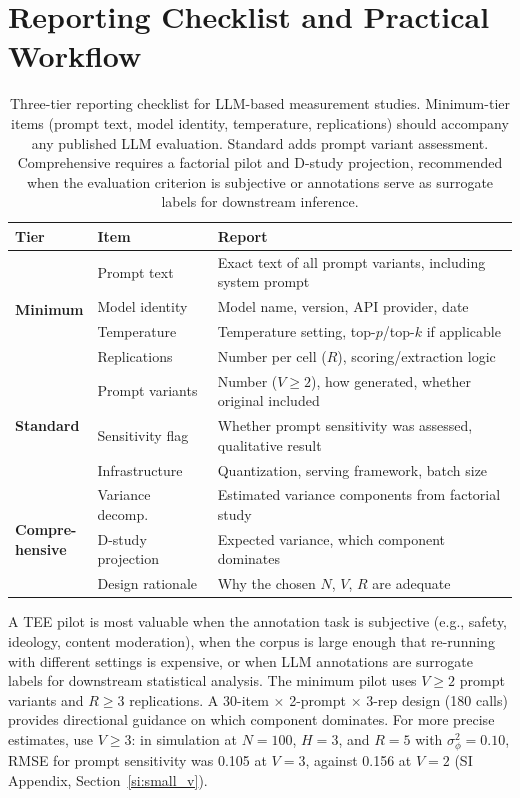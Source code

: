 \clearpage

\section{Reporting Checklist and Practical Workflow}
\label{si:checklist}

\begin{table}[ht]
\centering
\caption{Three-tier reporting checklist for LLM-based measurement studies. Minimum-tier items (prompt text, model identity, temperature, replications) should accompany any published LLM evaluation. Standard adds prompt variant assessment. Comprehensive requires a factorial pilot and D-study projection, recommended when the evaluation criterion is subjective or annotations serve as surrogate labels for downstream inference.}
\label{tab:checklist}
\small
\begin{tabular}{llp{7.5cm}}
\toprule
\textbf{Tier} & \textbf{Item} & \textbf{Report} \\
\midrule
\multirow{4}{*}{\textbf{Minimum}}
  & Prompt text & Exact text of all prompt variants, including system prompt \\
  & Model identity & Model name, version, API provider, date \\
  & Temperature & Temperature setting, top-$p$/top-$k$ if applicable \\
  & Replications & Number per cell ($R$), scoring/extraction logic \\
\midrule
\multirow{3}{*}{\textbf{Standard}}
  & Prompt variants & Number ($V \geq 2$), how generated, whether original included \\
  & Sensitivity flag & Whether prompt sensitivity was assessed, qualitative result \\
  & Infrastructure & Quantization, serving framework, batch size \\
\midrule
\multirow{3}{*}{\parbox{2.2cm}{\textbf{Compre-\\hensive}}}
  & Variance decomp. & Estimated variance components from factorial study \\
  & D-study projection & Expected variance, which component dominates \\
  & Design rationale & Why the chosen $N$, $V$, $R$ are adequate \\
\bottomrule
\end{tabular}
\end{table}

A TEE pilot is most valuable when the annotation task is subjective (e.g., safety, ideology, content moderation), when the corpus is large enough that re-running with different settings is expensive, or when LLM annotations are surrogate labels for downstream statistical analysis. The minimum pilot uses $V \geq 2$ prompt variants and $R \geq 3$ replications. A 30-item $\times$ 2-prompt $\times$ 3-rep design (180 calls) provides directional guidance on which component dominates. For more precise estimates, use $V \geq 3$: in simulation at $N = 100$, $H = 3$, and $R = 5$ with $\sigma^2_\phi = 0.10$, RMSE for prompt sensitivity was 0.105 at $V = 3$, against 0.156 at $V = 2$ (SI Appendix, Section~\ref{si:small_v}).

